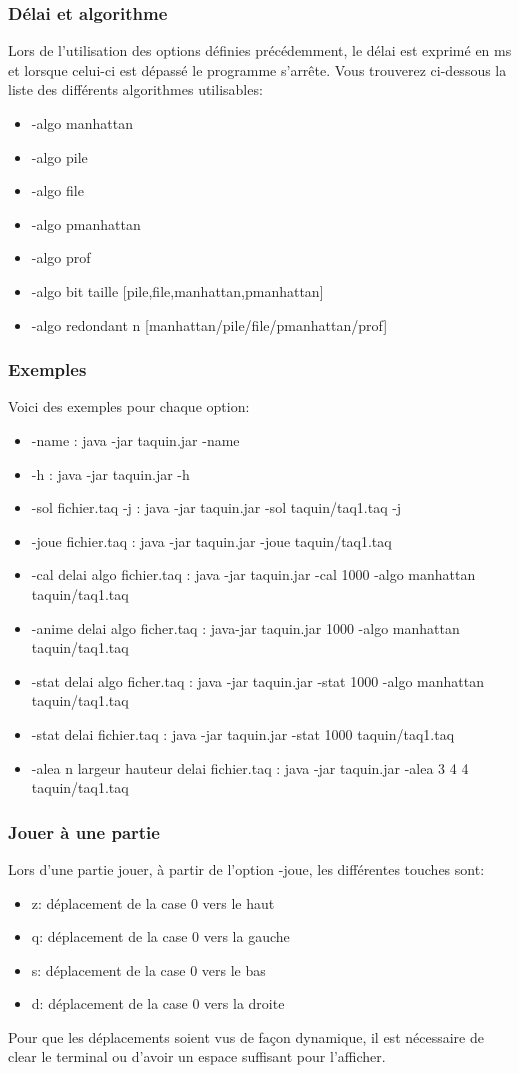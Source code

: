 \documentclass{beamer}
\begin{document}
  \begin{frame}
	\frametitle{Délai et algorithme}
	Lors de l'utilisation des options définies précédemment, le délai est exprimé en ms et lorsque celui-ci est dépassé le programme s'arrête. Vous trouverez ci-dessous la liste des différents algorithmes utilisables:
	\begin{itemize}
	\item -algo manhattan
	\item -algo pile
	\item -algo file
	\item -algo pmanhattan
	\item -algo prof 
	\item -algo bit taille [pile,file,manhattan,pmanhattan]
	\item -algo redondant n [manhattan/pile/file/pmanhattan/prof]
	\end{itemize}
  \end{frame}
  \begin{frame}
   \frametitle{Exemples}
	Voici des exemples pour chaque option:
\begin{itemize}
	\item -name : java -jar taquin.jar -name
	\item -h : java -jar taquin.jar -h
	\item -sol fichier.taq -j : java -jar taquin.jar -sol taquin/taq1.taq -j
	\item -joue fichier.taq : java -jar taquin.jar -joue taquin/taq1.taq
	\item -cal delai algo fichier.taq : java -jar taquin.jar -cal 1000 -algo manhattan taquin/taq1.taq 
	\item -anime delai algo ficher.taq : java-jar taquin.jar 1000 -algo manhattan taquin/taq1.taq
	\item -stat delai algo ficher.taq : java -jar taquin.jar -stat 1000 -algo manhattan taquin/taq1.taq 
	\item -stat delai fichier.taq : java -jar taquin.jar -stat 1000 taquin/taq1.taq
	\item -alea n largeur hauteur delai fichier.taq : java -jar taquin.jar -alea 3 4 4 taquin/taq1.taq
	\end{itemize}
  \end{frame}
  \begin{frame}
   \frametitle{Jouer à une partie}
	Lors d'une partie jouer, à partir de l'option -joue, les différentes touches sont:
	\begin{itemize}
	\item z: déplacement de la case 0 vers le haut
	\item q: déplacement de la case 0 vers la gauche
	\item s: déplacement de la case 0 vers le bas
	\item d: déplacement de la case 0 vers la droite
	\end{itemize}
	Pour que les déplacements soient vus de façon dynamique, il est nécessaire de clear le terminal ou d'avoir un espace suffisant pour l'afficher.
	\end{frame}
\end{document}

